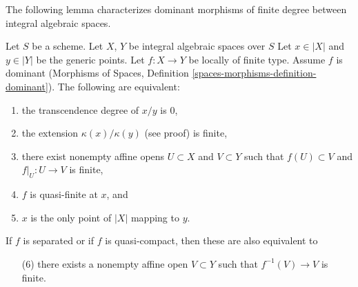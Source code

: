 \noindent
The following lemma characterizes dominant morphisms of finite degree
between integral algebraic spaces.

\begin{lemma}
\label{lemma-finite-degree}
Let $S$ be a scheme. Let $X$, $Y$ be integral algebraic spaces over $S$
Let $x \in |X|$ and $y \in |Y|$ be the generic points. Let $f : X \to Y$
be locally of finite type. Assume $f$ is dominant
(Morphisms of Spaces, Definition \ref{spaces-morphisms-definition-dominant}).
The following are equivalent:
\begin{enumerate}
\item the transcendence degree of $x/y$ is $0$,
\item the extension $\kappa(x)/\kappa(y)$ (see proof) is finite,
\item there exist nonempty affine opens $U \subset X$ and $V \subset Y$
such that $f(U) \subset V$ and $f|_U : U \to V$ is finite,
\item $f$ is quasi-finite at $x$, and
\item $x$ is the only point of $|X|$ mapping to $y$.
\end{enumerate}
If $f$ is separated or if $f$ is quasi-compact, then these are
also equivalent to
\begin{enumerate}
\item[(6)] there exists a nonempty affine open $V \subset Y$ such
that $f^{-1}(V) \to V$ is finite.
\end{enumerate}
\end{lemma}

